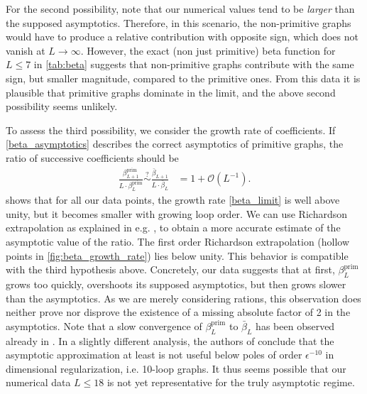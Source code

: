 \documentclass[11pt,a4paper]{article}
\renewcommand{\|}{\rule[-0.4ex]{0.2ex}{1.2em}}
\begin{document}
For the second possibility,   note that   our numerical values tend to be \emph{larger} than the supposed asymptotics. Therefore, in this scenario, the non-primitive graphs would have to produce a relative contribution with opposite sign, which does not vanish at $L \rightarrow\infty$. However,    the exact (non just primitive) beta function for $L\leq 7$ in \cref{tab:beta} suggests that non-primitive graphs contribute with the same sign, but smaller magnitude, compared to the primitive ones. From this data it is plausible that primitive graphs dominate in the limit, and the above second possibility  seems unlikely.


To assess the third possibility, we consider the growth rate of coefficients.
If \cref{beta_asymptotics} describes the correct asymptotics of primitive graphs,   the ratio of successive coefficients should be
\begin{align}\label{beta_limit}
	\frac{\beta^\text{prim}_{L+1}}{L\cdot \beta^\text{prim}_L} \overset{?}{\sim }  \frac{\bar \beta_{L+1}}{L \cdot \bar \beta_L}&=1 + \mathcal{O} \left( L^{-1} \right) .
\end{align}
 shows that for all our data points, the growth rate \cref{beta_limit} is well above unity, but it becomes smaller with growing loop order. We can use Richardson extrapolation \cite{richardson_approximate_1911} as explained in e.g. \cite{aniceto_primer_2019}, to obtain a more accurate estimate of the asymptotic value of the ratio. The first order Richardson extrapolation (hollow points in \cref{fig:beta_growth_rate}) lies below unity.  This behavior is compatible with the third hypothesis above. Concretely, our data suggests that at first, $\beta^\text{prim}_L$ grows too quickly, overshoots its supposed asymptotics, but then grows slower than the asymptotics. As we are merely considering rations, this observation does neither prove nor disprove the existence of a missing absolute factor of 2 in the asymptotics. Note that a slow convergence of $\beta^\text{prim}_L$ to $\bar \beta_L$ has been observed already in \cite{kompaniets_minimally_2017}. 
In a slightly different analysis, the authors of \cite{komarova_asymptotic_2001} conclude that the asymptotic  approximation at least is not useful below poles of order $\epsilon^{-10}$ in dimensional regularization, i.e. 10-loop graphs. It thus seems possible that our numerical data $L \leq 18$ is not yet representative for the truly asymptotic regime. 
\end{document}
